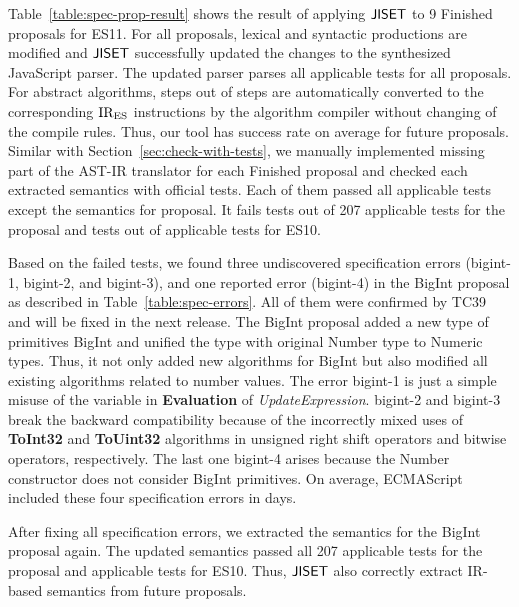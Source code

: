 Table~\ref{table:spec-prop-result} shows the result of applying \( \text{\sf JISET} \) to 9
Finished proposals for ES11.  For all proposals,  lexical and
 syntactic productions are modified and \( \text{\sf JISET} \) successfully
updated the changes to the synthesized JavaScript parser.  The updated parser
parses all applicable tests for all proposals.  For abstract algorithms,
 steps out of  steps are automatically converted to the
corresponding \( \text{IR}_\text{ES} \) instructions by the algorithm compiler without
changing of the compile rules.  Thus, our tool has  success rate
on average for future proposals.  Similar with
Section~\ref{sec:check-with-tests}, we manually implemented missing part of the
AST-IR translator for each Finished proposal and checked each extracted
semantics with official tests.  Each of them passed all applicable tests except
the semantics for  proposal.  It fails  tests out of 207
applicable tests for the proposal and  tests out of 
applicable tests for ES10.

Based on the failed tests, we found three undiscovered specification errors
(bigint-1, bigint-2, and bigint-3), and one reported error (bigint-4) in the
BigInt proposal as described in Table~\ref{table:spec-errors}.  All of
them were confirmed by TC39 and will be fixed in the next release.  The BigInt
proposal added a new type of primitives BigInt and unified the type with
original Number type to Numeric types.  Thus, it not only added new
algorithms for BigInt but also modified all existing algorithms related to
number values.  The error bigint-1 is just a simple misuse of the variable
 in {\bf Evaluation} of {\it UpdateExpression}. bigint-2 and
bigint-3 break the backward compatibility because of the incorrectly mixed uses
of {\bf ToInt32} and {\bf ToUint32} algorithms in unsigned right shift operators
and bitwise operators, respectively. The last one bigint-4 arises because the
Number constructor does not consider BigInt primitives.  On average, ECMAScript
included these four specification errors in  days.

After fixing all specification errors, we extracted the semantics for the BigInt
proposal again.  The updated semantics passed all 207 applicable tests for the
proposal and  applicable tests for ES10.  Thus, \( \text{\sf JISET} \) also
correctly extract IR-based semantics from future proposals.
